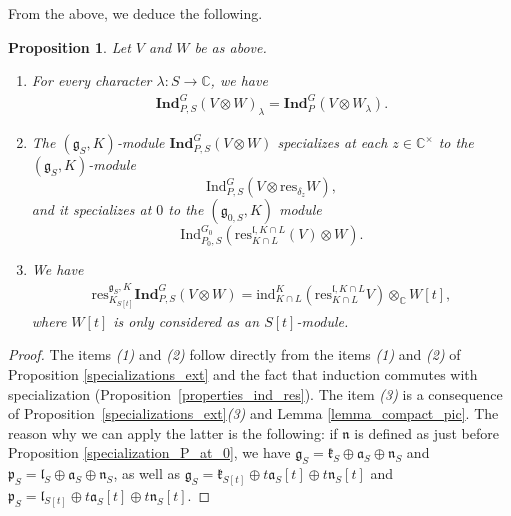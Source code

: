 \documentclass{amsart}
\newtheorem{proposition}[theorem]{Proposition}
\theoremstyle{definition}
\begin{document}
From the above, we deduce the following.


\begin{proposition}\label{properties_induction}
    Let $V$ and $W$ be as above.
    \begin{enumerate}
        \item For every character $\lambda : S \to \mathbb{C}$, we have
        \begin{gather*}
            \mathbf{Ind}_{P,S}^G(V \otimes W)_\lambda = \mathbf{Ind}_{P}^G(V \otimes W_\lambda).
        \end{gather*}
        \item The $(\bm{\mathfrak{g}}_S, K)$-module $\mathbf{Ind}_{P,S}^G(V \otimes W)$ specializes at each $z \in \mathbb{C}^\times$ to the $(\mathfrak{g}_S,K)$-module
        \[\mathrm{Ind}_{P,S}^G(V \otimes \mathrm{res}_{\delta_z}W),\]
        and it specializes at $0$ to the $(\mathfrak{g}_{0,S},K)$ module
        \[\mathrm{Ind}^{G_0}_{P_0,S}(\mathrm{res}_{K\cap L}^{\mathfrak{l}, K\cap L}(V)\otimes W).\]
        \item We have
        \begin{gather*}
            \mathrm{res}_{K_{S[t]}}^{\bm{\mathfrak{g}}_S,K} \mathbf{Ind}_{P,S}^G(V \otimes W) = \mathrm{ind}_{K\cap L}^{K}(\mathrm{res}_{K\cap L}^{\mathfrak{l}, K\cap L} V) \otimes_\mathbb{C} W[t],
        \end{gather*}
        where $W[t]$ is only considered as an $S[t]$-module.
    \end{enumerate}
\end{proposition}

\begin{proof}
    The items \textit{(1)} and \textit{(2)} follow directly from the items \textit{(1)} and \textit{(2)} of Proposition \ref{specializations_ext} and the fact that induction commutes with specialization (Proposition~\ref{properties_ind_res}). The item \textit{(3)} is a consequence of Proposition~\ref{specializations_ext}\textit{(3)} and Lemma \ref{lemma_compact_pic}. The reason why we can apply the latter is the following: if $\mathfrak{n}$ is defined as just before Proposition \ref{specialization_P_at_0}, we have $\mathfrak{g}_S = \mathfrak{k}_S \oplus \mathfrak{a}_S \oplus \mathfrak{n}_S$ and $\mathfrak{p}_S = \mathfrak{l}_S\oplus\mathfrak{a}_S \oplus \mathfrak{n}_S$, as well as $\bm{\mathfrak{g}}_S = \mathfrak{k}_{S[t]} \oplus t\mathfrak{a}_S[t] \oplus t\mathfrak{n}_S[t]$ and $\bm{\mathfrak{p}}_S = \mathfrak{l}_{S[t]}\oplus t\mathfrak{a}_S[t] \oplus t\mathfrak{n}_S[t]$.
\end{proof}
\end{document}
